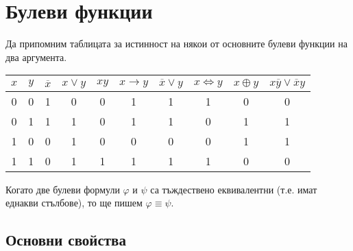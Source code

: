 \chapter{Булеви функции}

Да припомним таблицата за истинност на някои от основните булеви функции на два аргумента.

\begin{tabular}{|c|c|c|c|c|c|c|c|c|c|}
  \hline
  $x$ & $y$ & $\overline{x}$ & $x \vee y$ & $xy$ & $x \rightarrow y$ & $\overline{x}\vee y$ & $x \iff y$ & $x \oplus y$ & $x\overline{y} \vee \overline{x}y$\\
  \hline
  \hline
  0 & 0 & 1 & 0 & 0 & 1 & 1 & 1 & 0 & 0 \\
  \hline
  0 & 1 & 1 & 1 & 0 & 1 & 1 & 0 & 1 & 1 \\
  \hline
  1 & 0 & 0 & 1 & 0 & 0 & 0 & 0 & 1 & 1 \\
  \hline
  1 & 1 & 0 & 1 & 1 & 1 & 1 & 1 & 0 & 0 \\
  \hline
\end{tabular}

Когато две булеви формули $\varphi$ и $\psi$ са тъждествено еквивалентни (т.е. имат еднакви стълбове), то ще пишем $\varphi \equiv \psi$.

\section{Основни свойства}

